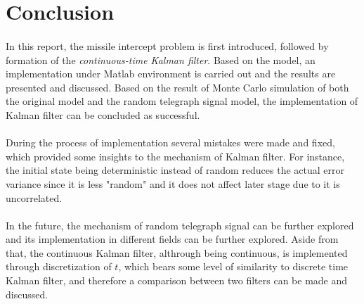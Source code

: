 \section{Conclusion}
\paragraph{}
In this report, the missile intercept problem is first introduced, followed by formation of the \textit{continuous-time Kalman filter}. Based on the model, an implementation under Matlab environment is carried out and the results are presented and discussed. Based on the result of Monte Carlo simulation of both the original model and the random telegraph signal model, the implementation of Kalman filter can be concluded as successful. \vspace{-12pt}
\paragraph{}
During the process of implementation several mistakes were made and fixed, which provided some insights to the mechanism of Kalman filter. For instance, the initial state being deterministic instead of random reduces the actual error variance since it is less "random" and it does not affect later stage due to it is uncorrelated. \vspace{-12pt}
\paragraph{}
In the future, the mechanism of random telegraph signal can be further explored and its implementation in different fields can be further explored. Aside from that, the continuous Kalman filter, althrough being continuous, is implemented through discretization of $t$, which bears some level of similarity to discrete time Kalman filter, and therefore a comparison between two filters can be made and discussed.

